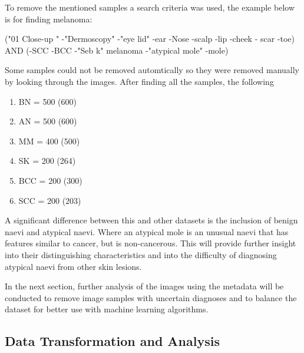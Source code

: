 To remove the mentioned samples a search criteria was used, the example below is for finding melanoma:

\begin{center}
("01 Close-up " -"Dermoscopy" -"eye lid" -ear -Nose -scalp -lip -cheek - scar -toe) AND (-SCC -BCC -"Seb k" melanoma -"atypical mole" -mole)
\end{center}

Some samples could not be removed automtically so they were removed manually by looking through the images. After finding all the samples, the following

\begin{enumerate}
\item BN = 500 (600)
\item AN = 500 (600)
\item MM = 400 (500)
\item SK = 200 (264)
\item BCC = 200 (300)
\item SCC = 200 (203)
\end{enumerate}

A significant difference between this and other datasets is the inclusion of benign naevi and atypical naevi. Where an atypical mole is an unusual naevi that has features similar to cancer, but is non-cancerous. This will provide further insight into their distinguishing characteristics and into the difficulty of diagnosing atypical naevi from other skin lesions.

In the next section, further analysis of the images using the metadata will be conducted to remove image samples with uncertain diagnoses and to balance the dataset for better use with machine learning algorithms.

\subsection{Data Transformation and Analysis}

